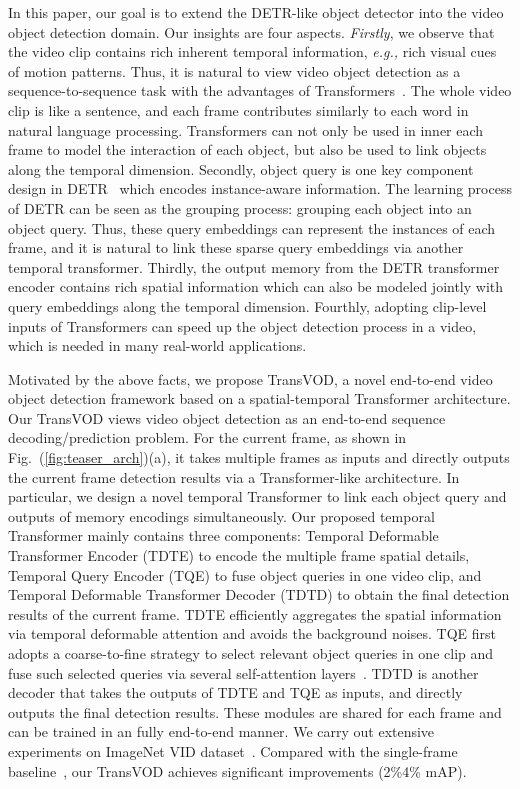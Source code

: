 \documentclass[10pt,journal,compsoc]{IEEEtran}
\begin{document}
In this paper, our goal is to extend the DETR-like object detector into the video object detection domain. Our insights are four aspects. \textit{Firstly}, we observe that the video clip contains rich inherent temporal information, \emph{e.g.,} rich visual cues of motion patterns. Thus, it is natural to view video object detection as a sequence-to-sequence task with the advantages of Transformers~\cite{Vaswani17attention}. 
The whole video clip is like a sentence, and each frame contributes similarly to each word in natural language processing. Transformers can not only be used in inner each frame to model the interaction of each object, but also be used to link objects along the temporal dimension. Secondly, object query is one key component design in DETR~\cite{detr} which encodes instance-aware information. The learning process of DETR can be seen as the grouping process: grouping each object into an object query. Thus, these query embeddings can represent the instances of each frame, and it is natural to link these sparse query embeddings via another temporal transformer. Thirdly, the output memory from the DETR transformer encoder contains rich spatial information which can also be modeled jointly with query embeddings along the temporal dimension. Fourthly, adopting clip-level inputs of Transformers can speed up the object detection process in a video, which is needed in many real-world applications. 

Motivated by the above facts, we propose TransVOD, a novel end-to-end video object detection framework based on a spatial-temporal Transformer architecture. Our TransVOD views video object detection as an end-to-end sequence decoding/prediction problem. For the current frame, as shown in Fig.~(\ref{fig:teaser_arch})(a), it takes multiple frames as inputs and directly outputs the current frame detection results via a Transformer-like architecture. In particular, we design a novel temporal Transformer to link each object query and outputs of memory encodings simultaneously. Our proposed temporal Transformer mainly contains three components: Temporal Deformable Transformer Encoder (TDTE) to encode the multiple frame spatial details, Temporal Query Encoder (TQE) to fuse object queries in one video clip, and Temporal Deformable Transformer Decoder (TDTD) to obtain the final detection results of the current frame. TDTE efficiently aggregates the spatial information via temporal deformable attention and avoids the background noises. TQE first adopts a coarse-to-fine strategy to select relevant object queries in one clip and fuse such selected queries via several self-attention layers~\cite{Vaswani17attention}. TDTD is another decoder that takes the outputs of TDTE and TQE as inputs, and directly outputs the final detection results. These modules are shared for each frame and can be trained in an fully end-to-end manner. We carry out extensive experiments on ImageNet VID dataset~\cite{russakovsky2015imagenet}. Compared with the single-frame baseline~\cite{zhu2020deformable}, our TransVOD achieves significant improvements (2\%4\% mAP). 
\end{document}

